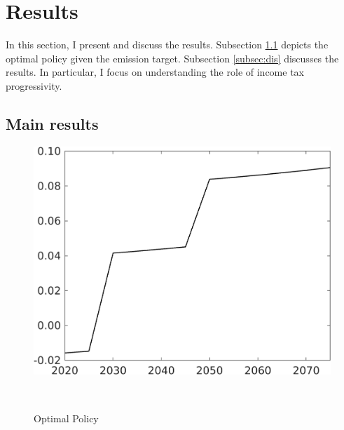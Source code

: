 \section{Results}\label{sec:res}

In this section, I present and discuss the results.
Subsection \ref{subsec:mr} depicts the optimal policy given the emission target. Subsection \ref{subsec:dis} discusses the results. In particular, I focus on understanding the role of income tax progressivity. %


\subsection{Main results}\label{subsec:mr}
\begin{figure}[h!!]
	\centering
	\caption{Optimal Policy }\label{fig:optPol}
	\begin{minipage}[]{0.4\textwidth}
		\includegraphics[width=1\textwidth]{../../codding_model/own_basedOnFried/optimalPol_elastS_DisuSci/figures/all_1705/Single_OPT_T_NoTaus_taul_spillover0_sep1_BN0_ineq0_red0_etaa0.79.png}
	\end{minipage}
\begin{minipage}[]{0.1\textwidth}
\
\end{minipage}
	\begin{minipage}[]{0.4\textwidth}

\end{minipage}
\end{figure}
